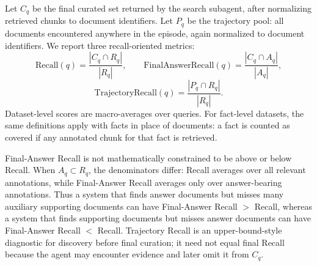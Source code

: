 \documentclass{article}
\newcommand{\sys}{\texttt{Harness-1}\xspace}
\begin{document}
Let $C_q$ be the final curated set returned by the search subagent, after
normalizing retrieved chunks to document identifiers. Let $P_q$ be the
trajectory pool: all documents encountered anywhere in the episode, again
normalized to document identifiers. We report three recall-oriented metrics:
\[
\mathrm{Recall}(q) = \frac{|C_q \cap R_q|}{|R_q|}, \qquad
\mathrm{FinalAnswerRecall}(q) = \frac{|C_q \cap A_q|}{|A_q|},
\]
\[
\mathrm{TrajectoryRecall}(q) = \frac{|P_q \cap R_q|}{|R_q|}.
\]
Dataset-level scores are macro-averages over queries. For fact-level datasets,
the same definitions apply with facts in place of documents: a fact is counted
as covered if any annotated chunk for that fact is retrieved.

Final-Answer Recall is not mathematically constrained to be above or below
Recall. When $A_q \subset R_q$, the denominators differ: Recall averages over
all relevant annotations, while Final-Answer Recall averages only over
answer-bearing annotations. Thus a system that finds answer documents but misses
many auxiliary supporting documents can have Final-Answer Recall $>$ Recall,
whereas a system that finds supporting documents but misses answer documents can
have Final-Answer Recall $<$ Recall. Trajectory Recall is an upper-bound-style
diagnostic for discovery before final curation; it need not equal final Recall
because the agent may encounter evidence and later omit it from $C_q$.


\end{document}
